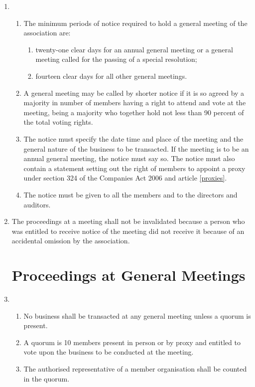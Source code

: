 \begin{enumerate}
\item
  \begin{enumerate}
  \item
    The minimum periods of notice required to hold a general meeting of
    the association are:
    \begin{enumerate}
    \item
      twenty-one clear days for an annual general meeting or a general
      meeting called for the passing of a special resolution;
    \item
      fourteen clear days for all other general meetings.
    \end{enumerate}
  \item
    A general meeting may be called by shorter notice if it is so
    agreed by a majority in number of members having a right to attend
    and vote at the meeting, being a majority who together hold not
    less than 90 percent of the total voting rights.
  \item
    The notice must specify the date time and place of the meeting and
    the general nature of the business to be transacted. If the meeting
    is to be an annual general meeting, the notice must say so. The
    notice must also contain a statement setting out the right of
    members to appoint a proxy under section 324 of the Companies Act
    2006 and article \ref{proxies}.
  \item
    The notice must be given to all the members and to the directors
    and auditors.
  \end{enumerate}

\item
  The proceedings at a meeting shall not be invalidated because a
  person who was entitled to receive notice of the meeting did not
  receive it because of an accidental omission by the association.

\section{Proceedings at General Meetings}

\item
  \begin{enumerate}
  \item
    No business shall be transacted at any general meeting unless a
    quorum is present.
  \item
    A quorum is 10 members present in person or by proxy and entitled to vote upon
      the business to be conducted at the meeting.
  \item
    The authorised representative of a member organisation shall be
    counted in the quorum.
  \end{enumerate}


\end{enumerate}
